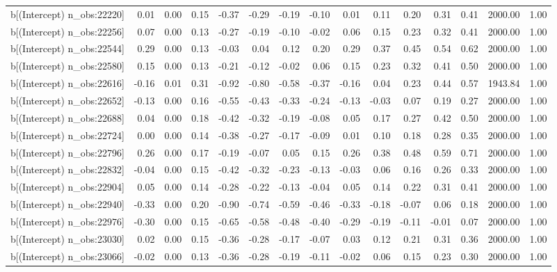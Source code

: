 \begin{table}[ht]
\begin{tabular}{rrrrrrrrrrrrrrr}
  b[(Intercept) n\_obs:22220] & 0.01 & 0.00 & 0.15 & -0.37 & -0.29 & -0.19 & -0.10 & 0.01 & 0.11 & 0.20 & 0.31 & 0.41 & 2000.00 & 1.00 \\ 
  b[(Intercept) n\_obs:22256] & 0.07 & 0.00 & 0.13 & -0.27 & -0.19 & -0.10 & -0.02 & 0.06 & 0.15 & 0.23 & 0.32 & 0.41 & 2000.00 & 1.00 \\ 
  b[(Intercept) n\_obs:22544] & 0.29 & 0.00 & 0.13 & -0.03 & 0.04 & 0.12 & 0.20 & 0.29 & 0.37 & 0.45 & 0.54 & 0.62 & 2000.00 & 1.00 \\ 
  b[(Intercept) n\_obs:22580] & 0.15 & 0.00 & 0.13 & -0.21 & -0.12 & -0.02 & 0.06 & 0.15 & 0.23 & 0.32 & 0.41 & 0.50 & 2000.00 & 1.00 \\ 
  b[(Intercept) n\_obs:22616] & -0.16 & 0.01 & 0.31 & -0.92 & -0.80 & -0.58 & -0.37 & -0.16 & 0.04 & 0.23 & 0.44 & 0.57 & 1943.84 & 1.00 \\ 
  b[(Intercept) n\_obs:22652] & -0.13 & 0.00 & 0.16 & -0.55 & -0.43 & -0.33 & -0.24 & -0.13 & -0.03 & 0.07 & 0.19 & 0.27 & 2000.00 & 1.00 \\ 
  b[(Intercept) n\_obs:22688] & 0.04 & 0.00 & 0.18 & -0.42 & -0.32 & -0.19 & -0.08 & 0.05 & 0.17 & 0.27 & 0.42 & 0.50 & 2000.00 & 1.00 \\ 
  b[(Intercept) n\_obs:22724] & 0.00 & 0.00 & 0.14 & -0.38 & -0.27 & -0.17 & -0.09 & 0.01 & 0.10 & 0.18 & 0.28 & 0.35 & 2000.00 & 1.00 \\ 
  b[(Intercept) n\_obs:22796] & 0.26 & 0.00 & 0.17 & -0.19 & -0.07 & 0.05 & 0.15 & 0.26 & 0.38 & 0.48 & 0.59 & 0.71 & 2000.00 & 1.00 \\ 
  b[(Intercept) n\_obs:22832] & -0.04 & 0.00 & 0.15 & -0.42 & -0.32 & -0.23 & -0.13 & -0.03 & 0.06 & 0.16 & 0.26 & 0.33 & 2000.00 & 1.00 \\ 
  b[(Intercept) n\_obs:22904] & 0.05 & 0.00 & 0.14 & -0.28 & -0.22 & -0.13 & -0.04 & 0.05 & 0.14 & 0.22 & 0.31 & 0.41 & 2000.00 & 1.00 \\ 
  b[(Intercept) n\_obs:22940] & -0.33 & 0.00 & 0.20 & -0.90 & -0.74 & -0.59 & -0.46 & -0.33 & -0.18 & -0.07 & 0.06 & 0.18 & 2000.00 & 1.00 \\ 
  b[(Intercept) n\_obs:22976] & -0.30 & 0.00 & 0.15 & -0.65 & -0.58 & -0.48 & -0.40 & -0.29 & -0.19 & -0.11 & -0.01 & 0.07 & 2000.00 & 1.00 \\ 
  b[(Intercept) n\_obs:23030] & 0.02 & 0.00 & 0.15 & -0.36 & -0.28 & -0.17 & -0.07 & 0.03 & 0.12 & 0.21 & 0.31 & 0.36 & 2000.00 & 1.00 \\ 
  b[(Intercept) n\_obs:23066] & -0.02 & 0.00 & 0.13 & -0.36 & -0.28 & -0.19 & -0.11 & -0.02 & 0.06 & 0.15 & 0.23 & 0.30 & 2000.00 & 1.00 \\ 

\end{tabular}
\end{table}
